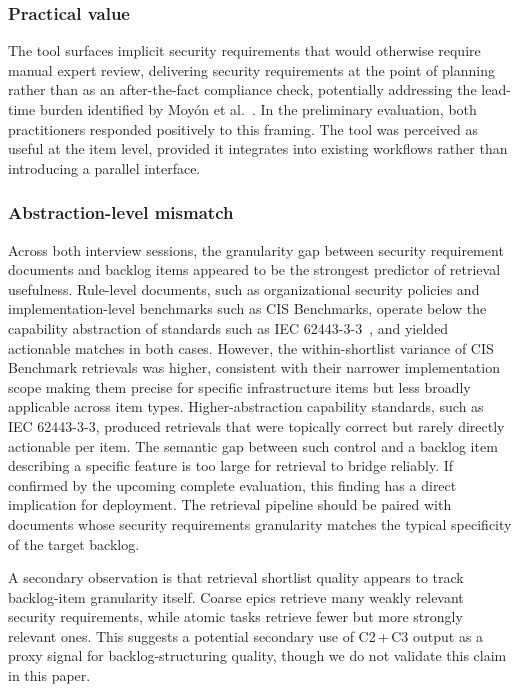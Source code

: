\subsubsection*{Practical value}

The tool surfaces implicit security requirements that would otherwise require manual expert review, delivering security requirements at the point of planning rather than as an after-the-fact compliance check, potentially addressing the lead-time burden identified by Moyón et al.~\cite{moyon2024challenges}.
In the preliminary evaluation, both practitioners responded positively to this framing. The tool was perceived as useful at the item level, provided it integrates into existing workflows rather than introducing a parallel interface.

\subsubsection*{Abstraction-level mismatch}\label{sec:discussion-c3-abstraction}

Across both interview sessions, the granularity gap between security requirement documents and backlog items appeared to be the strongest predictor of retrieval usefulness.
Rule-level documents, such as organizational security policies and implementation-level benchmarks such as CIS Benchmarks, operate below the capability abstraction of standards such as IEC 62443-3-3~\cite{iec2013iec62443-3-3}, and yielded actionable matches in both cases.
However, the within-shortlist variance of CIS Benchmark retrievals was higher, consistent with their narrower implementation scope making them precise for specific infrastructure items but less broadly applicable across item types.
Higher-abstraction capability standards, such as IEC 62443-3-3, produced retrievals that were topically correct but rarely directly actionable per item. The semantic gap between such control and a backlog item describing a specific feature is too large for retrieval to bridge reliably.
If confirmed by the upcoming complete evaluation, this finding has a direct implication for deployment.
The retrieval pipeline should be paired with documents whose security requirements granularity matches the typical specificity of the target backlog.

A secondary observation is that retrieval shortlist quality appears to track backlog-item granularity itself. Coarse epics retrieve many weakly relevant security requirements, while atomic tasks retrieve fewer but more strongly relevant ones.
This suggests a potential secondary use of C2\,+\,C3 output as a proxy signal for backlog-structuring quality, though we do not validate this claim in this paper.

